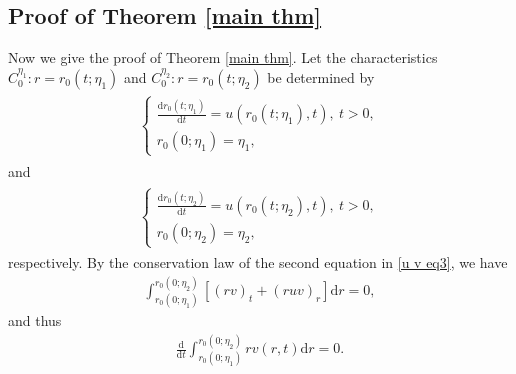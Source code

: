 \documentclass[10pt,leqno]{amsart}
\numberwithin{equation}{section}
\begin{document}
\subsection{Proof of Theorem \ref{main thm}}



Now we give the proof of Theorem \ref{main thm}.	Let the characteristics $C_{0}^{\eta_1}: r = r_{0}(t;\eta_1)$ and $C_{0}^{\eta_2}: r = r_{0}(t;\eta_2)$ be determined by
	\begin{equation*} 
		\begin{aligned}
			\begin{split}
				\left\lbrace
				\begin{array}{lr}	
					\frac{\mathrm{d}r_{0}(t;\eta_1)}{\mathrm{d}t} = u(r_{0}(t;\eta_1),t)	, \ t>0, \\
					r_{0}(0;\eta_1) =\eta_1	,			 
				\end{array}	
				\right.
			\end{split}	
		\end{aligned}
	\end{equation*}
	and
	\begin{equation*} 
		\begin{aligned}
			\begin{split}
				\left\lbrace
				\begin{array}{lr}	
					\frac{\mathrm{d}r_{0}(t;\eta_2)}{\mathrm{d}t} = u(r_{0}(t;\eta_2),t)	, \ t>0, \\
					r_{0}(0;\eta_2) =\eta_2,				 
				\end{array}	
				\right.
			\end{split}	
		\end{aligned}
	\end{equation*}
	respectively. By the conservation law of the second equation in \eqref{u v eq3}, we have
	\begin{equation}
		\begin{aligned}
			\int_{r_{0}(0;\eta_1)}^{r_{0}(0;\eta_2)} [ (rv)_t + (ruv)_r ] \mathrm{d} r = 0,
		\end{aligned}
	\end{equation}	
	and thus
	\begin{equation} \label{conservation of mass}
		\begin{aligned}
			\frac{\mathrm{d}}{\mathrm{d}t} \int_{r_{0}(0;\eta_1)}^{r_{0}(0;\eta_2)} r v (r,t) \mathrm{d}r = 0.
		\end{aligned}
	\end{equation}	
\end{document}

